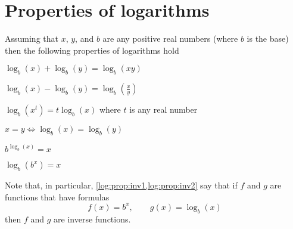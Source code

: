 \section{Properties of logarithms}
\begin{pccspecialcomment}
	Assuming that $x$, $y$, and $b$ are any positive real numbers (where $b$ 
	is the base) then the following properties of logarithms hold
	\begin{props}
		\item\label{log:prop:add} $\log_b(x)+\log_b(y)=\log_b(xy)$ 
		\item\label{log:prop:sub} $\log_b(x)-\log_b(y)=\log_b\left( \frac{x}{y} \right)$ 
		\item\label{log:prop:pow} $\log_b(x^t)=t\log_b(x)$ where $t$ is any real number
		\item\label{log:prop:obv} $x=y\Leftrightarrow \log_b(x)=\log_b(y)$
		\item\label{log:prop:inv1} $b^{\log_b(x)}=x$
		\item\label{log:prop:inv2} $\log_b(b^x)=x$
	\end{props}
	Note that, in particular, \cref{log:prop:inv1,log:prop:inv2} say that if $f$ and $g$ 
	are functions that have formulas
	\[
		f(x)=b^x, \qquad g(x)=\log_b(x)
	\]
	then $f$ and $g$ are inverse functions. 
\end{pccspecialcomment}
